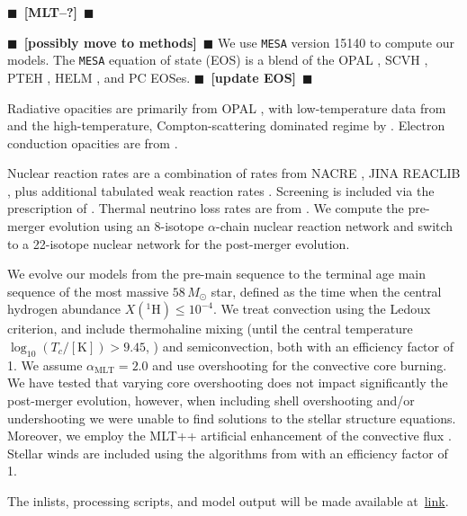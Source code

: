 \documentclass[twocolumn,twocolappendix,trackchanges]{aastex63}
\newcommand{\code}[1]{\texttt{#1}}
\newcommand{\todo}[1]{{\large $\blacksquare$~\textbf{\color{red}[#1]}}~$\blacksquare$}
\begin{document}
\todo{MLT--?}

\todo{possibly move to methods}
We use \code{MESA} version 15140 to compute our models.  The
\code{MESA} equation of state (EOS) is a blend of the OPAL \citet{Rogers2002}, SCVH
\citet{Saumon1995}, PTEH \citet{Pols1995}, HELM \citet{Timmes2000},
and PC \citet{Potekhin2010} EOSes. \todo{update EOS}

Radiative opacities are primarily from OPAL \citep{Iglesias1993,
  Iglesias1996}, with low-temperature data from \citet{Ferguson2005}
and the high-temperature, Compton-scattering dominated regime by
\citet{Buchler1976}. Electron conduction opacities are from
\citet{Cassisi2007}.

Nuclear reaction rates are a combination of rates from NACRE
\citep{Angulo1999}, JINA REACLIB \citep{Cyburt2010}, plus additional
tabulated weak reaction rates \citet{Fuller1985, Oda1994,
  Langanke2000}. Screening is included via the prescription of
\citet{Chugunov2007}.  Thermal neutrino loss rates are from
\citet{Itoh1996}. We compute the pre-merger evolution using an
8-isotope $\alpha$-chain nuclear reaction network and switch to a
22-isotope nuclear network for the post-merger evolution.

We evolve our models from the pre-main sequence to the terminal age
main sequence of the most massive $58\,M_\odot$ star, defined as the
time when the central hydrogen abundance $X(^1\mathrm{H})\leq 10^{-4}$.
We treat convection using the Ledoux criterion, and include
thermohaline mixing (until the central temperature
$\log_{10}(T_c/\mathrm{[K]})>9.45$, \citealt{farmer:16}) and semiconvection, both with an
efficiency factor of 1. We assume $\alpha_\mathrm{MLT}=2.0$ and use
\cite{brott:11} overshooting for the convective core burning. We have
tested that varying core overshooting does not impact significantly the
post-merger evolution, however, when including shell overshooting
and/or undershooting we were unable to find solutions to the stellar
structure equations. Moreover, we employ the MLT++ artificial
enhancement of the convective flux \citep[e.g.,][]{paxton:15,
  jiang:15}. Stellar winds are included using the algorithms from
\cite{vink:01} with an efficiency factor of 1.%

The inlists, processing scripts, and model output will be made available at~\href{link}{link}.



\end{document}
